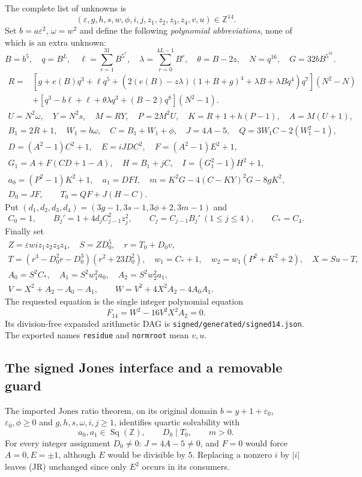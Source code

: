 The complete list of unknowns is
\[
 (\varepsilon,g,h,s,w,\phi,i,j,z_1,z_2,z_3,z_4,v,u)\in\mathbb Z^{14}.
\]
Set $b=a\varepsilon^2$, $\omega=w^2$ and define the following
\emph{polynomial abbreviations}, none of which is an extra unknown:
\[
 B=b^5,\quad q=B^L,\quad \ell=\sum_{r=1}^{31}B^{5^r},\quad
 \lambda=\sum_{r=0}^{4L-1}B^r,\quad \theta=B-2z,
 \quad N=q^{16},\quad G=32bB^{5^{31}}.
\]
\begin{align*}
 R={}&\left[g+e(B)q^3+\ell q^5+
 \left(2(e(B)-z\lambda)(1+B+g)^4+\lambda B+\lambda Bq^4\right)q^7\right](N^2-N)\\
 &+\left[q^3-b\ell+\ell+\theta\lambda q^3+(B-2)q^8\right](N^2-1).
\end{align*}
\begin{gather*}
 U=N^2\omega,\quad Y=N^2s,\quad M=RY,\quad P=2M^2U,
 \quad K=R+1+h(P-1),\quad A=M(U+1),\\
 B_1=2R+1,\quad W_1=b\omega,\quad C=B_1+W_1+\phi,
 \quad J=4A-5,\quad Q=3W_1C-2(W_1^2-1),\\
 D=(A^2-1)C^2+1,\quad E=iJDC^2,\quad F=(A^2-1)E^2+1,\\
 G_1=A+F(CD+1-A),\quad H=B_1+jC,\quad I=(G_1^2-1)H^2+1,\\
 a_0=(P^2-1)K^2+1,\quad a_1=DFI,\quad
 m=K^2G-4(C-KY)^2G-8gK^2,\\
 D_0=JF,\qquad T_0=QF+J(H-C).
\end{gather*}
Put $(d_1,d_2,d_3,d_4)=(3g-1,3s-1,3\phi+2,3m-1)$ and
\[
 C_0=1,\qquad B_j'=1+4d_jC_{j-1}^2z_j^2,\qquad
 C_j=C_{j-1}B_j'\ (1\le j\le4),\qquad C_*=C_4.
\]
Finally set
\begin{gather*}
 Z=\varepsilon wi z_1z_2z_3z_4,\quad S=ZD_0^5,\quad r=T_0+D_0v,\\
 T=(r^3-D_0^2r-D_0^3)(r^2+23D_0^2),\quad
 w_1=C_*+1,\quad w_2=w_1(P^2+K^2+2),\quad X=Su-T,\\
 A_0=S^2C_*,\quad A_1=S^2w_1^2a_0,\quad A_2=S^2w_2^2a_1,\\
 V=X^2+A_2-A_0-A_1,\qquad W=V^2+4X^2A_2-4A_0A_1.
\end{gather*}
The requested equation is the single integer polynomial equation
\[
 \boxed{F_{14}=W^2-16V^2X^2A_2=0.}
\]
Its division-free expanded arithmetic DAG is
\texttt{signed/generated/}\allowbreak\texttt{signed14.json}. The exported names
\texttt{residue} and \texttt{normroot} mean $v,u$.

\subsection{The signed Jones interface and a removable guard}
The imported Jones ratio theorem, on its original domain
$b=y+1+\varepsilon_0$, $\varepsilon_0,\phi\ge0$ and
$g,h,s,\omega,i,j\ge1$, identifies quartic solvability with
\[
 a_0,a_1\in\operatorname{Sq}(\mathbb Z),\qquad D_0\mid T_0,
 \qquad m>0.\tag{JR}
\]
For every integer assignment $D_0\ne0$: $J=4A-5\ne0$, and $F=0$
would force $A=0,E=\pm1$, although $E$ would be divisible by $5$.
Replacing a nonzero $i$ by $|i|$ leaves (JR) unchanged since only $E^2$
occurs in its consumers.

